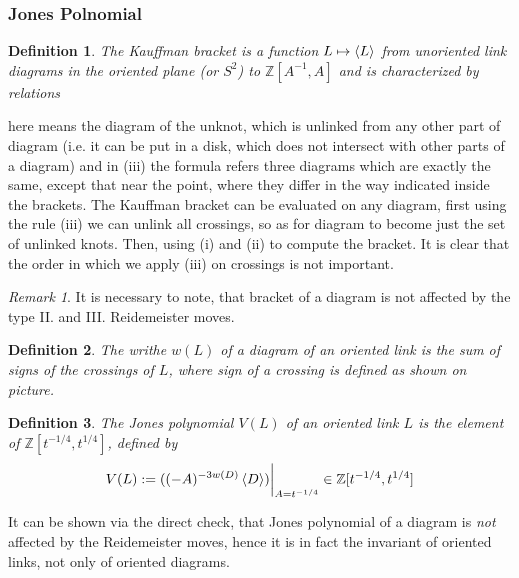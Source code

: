 \documentclass[10pt]{article} %
\newtheorem{definition}{Definition}[section]
\theoremstyle{remark}
\newtheorem{remark}{Remark}
\begin{document}
\subsubsection{Jones Polnomial}
\begin{definition}The Kauffman bracket is a function $L\mapsto\left<L\right>$ from unoriented link diagrams
in the oriented plane (or $S^2$) to $\mathbb{Z}[A^{-1},A]$ and is characterized by relations
\end{definition}
here \fullmoon means the diagram of the unknot, which is unlinked from any other part of diagram (i.e. it can be put in a disk, which does not
intersect with other parts of a diagram) and in (iii) the formula refers three diagrams which are exactly the same, except that near the point,
where they differ in the way indicated inside the brackets. The Kauffman bracket can be evaluated on any diagram, first using the rule (iii)
we can unlink all crossings, so as for diagram to become just the set of unlinked knots. Then, using (i) and (ii) to compute the bracket. It is 
clear that the order in which we apply (iii) on crossings is not important.
\begin{remark}\label{KauffmanInvariantRemark}
	It is necessary to note, that bracket of a diagram is not affected by the type II. and III. Reidemeister moves.
\end{remark}
\begin{definition}The writhe $w(L)$ of a diagram of an oriented link is the sum of signs of the crossings of $L$, where sign of a crossing is
	defined as shown on picture.
\end{definition}
\begin{definition}
	The Jones polynomial $V(L)$ of an oriented link $L$ is the element of $\mathbb{Z}[t^{-1/4},t^{1/4}]$, defined by
	\[V(L):=((-A)^{-3w(D)}\left<D\right>)\bigg|_{A=t^{-1/4}}\in\mathbb{Z}[t^{-1/4},t^{1/4}]\]
\end{definition}
It can be shown via the direct check, that Jones polynomial of a diagram is \textit{not} affected by the Reidemeister moves, hence
it is in fact the invariant of oriented links, not only of oriented diagrams.
\end{document}
